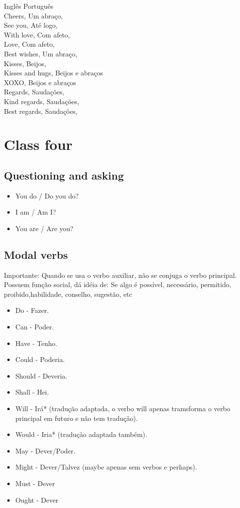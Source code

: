 \documentclass[12pt,a4paper]{article} %
\begin{document}
\begin{itemize}
		Inglês 	Português\\
		Cheers, 	Um abraço,\\
		See you, 	Até logo,\\
		With love, 	Com afeto,\\
		Love, 	Com afeto,\\
		Best wishes, 	Um abraço,\\
		Kisses, 	Beijos,\\
		Kisses and hugs, 	Beijos e abraços\\
		XOXO, 	Beijos e abraços\\
		Regards, 	Saudações,\\
		Kind regards, 	Saudações,\\
		Best regards, 	Saudações,\\
	\end{itemize}
\section{Class four}
\subsection{Questioning and asking}
	\begin{itemize}
		\item You do / Do you do?
		\item I am / Am I?
		\item You are / Are you?
	\end{itemize}
\subsection{Modal verbs}
Importante: Quando se usa o verbo auxiliar, não se conjuga o verbo principal.\\
Possuem função social, dá idéia de: Se algo é possível, necessário, permitido, proibido,habilidade, conselho, sugestão, etc
	\begin{itemize}
		\item Do - Fazer.
		\item Can - Poder.
		\item Have - Tenho.
		\item Could - Poderia.
		\item Should - Deveria.
		\item Shall - Hei.
		\item Will - Irá* (tradução adaptada, o verbo will apenas tramsforma o verbo principal em futuro e não tem tradução).
		\item Would - Iria* (tradução adaptada também).
		\item May - Dever/Poder.
		\item Might - Dever/Talvez (maybe apenas sem verbos e perhaps).
		\item Must - Dever
		\item Ought - Dever
	\end{itemize}
\end{document}
